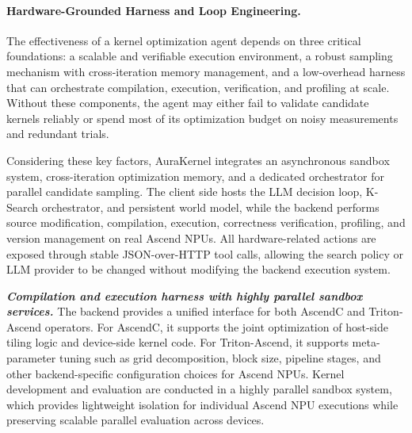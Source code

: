 
\paragraph{Hardware-Grounded Harness and Loop Engineering.}
The effectiveness of a kernel optimization agent depends on three critical foundations:  a scalable and verifiable execution environment,  a robust sampling mechanism with cross-iteration memory management, and  a low-overhead harness that can orchestrate compilation, execution, verification, and profiling at scale. Without these components, the agent may either fail to validate candidate kernels reliably or spend most of its optimization budget on noisy measurements and redundant trials.

Considering these key factors, AuraKernel integrates an asynchronous sandbox system, cross-iteration optimization memory, and a dedicated orchestrator for parallel candidate sampling. The client side hosts the LLM decision loop, K-Search orchestrator, and persistent world model, while the backend performs source modification, compilation, execution, correctness verification, profiling, and version management on real Ascend NPUs. All hardware-related actions are exposed through stable JSON-over-HTTP tool calls, allowing the search policy or LLM provider to be changed without modifying the backend execution system.

\textit{\textbf{Compilation and execution harness with highly parallel sandbox services.}}
The backend provides a unified interface for both AscendC and Triton-Ascend operators. For AscendC, it supports the joint optimization of host-side tiling logic and device-side kernel code. For Triton-Ascend, it supports meta-parameter tuning such as grid decomposition, block size, pipeline stages, and other backend-specific configuration choices for Ascend NPUs. Kernel development and evaluation are conducted in a highly parallel sandbox system, which provides lightweight isolation for individual Ascend NPU executions while preserving scalable parallel evaluation across devices.


